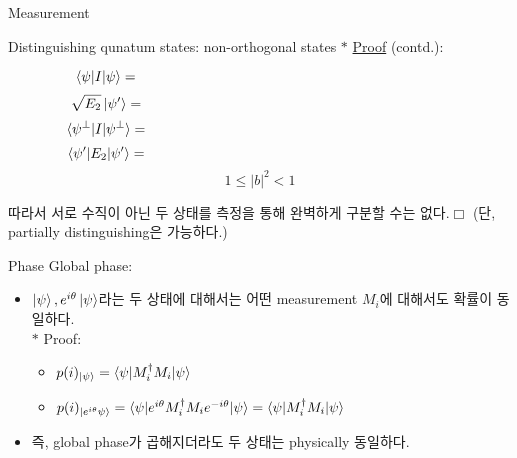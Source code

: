 \documentclass[9pt]{beamer}
\begin{document}
\begin{section}{Measurement}
        \begin{frame}{Distinguishing qunatum states: non-orthogonal states}
            $\ast$ \underline{Proof} (contd.):
            
            $$\braket{\psi|I|\psi} = \qquad \qquad \qquad \qquad \qquad \qquad \qquad \qquad\qquad \qquad \qquad $$
            \vspace{0.5cm}
            $$\sqrt{E_2} \ket{\psi'} = \qquad \qquad \qquad \qquad \qquad \qquad \qquad \qquad\qquad \qquad \qquad $$
            \vspace{0.5cm}
            $$\braket{\psi^\perp|I|\psi^\perp} = \qquad \qquad \qquad \qquad \qquad \qquad \qquad \qquad\qquad \qquad  \qquad $$
            \vspace{0.5cm}
            $$\braket{\psi'|E_2|\psi'} =\qquad \qquad \qquad \qquad \qquad \qquad \qquad \qquad\qquad \qquad \qquad  $$
            \vspace{0.3cm}
            $$1 \le |b|^2 < 1$$
            
            \vspace{0.1cm}

            따라서 서로 수직이 아닌 두 상태를 측정을 통해 완벽하게 구분할 수는 없다.$\Box$ (단, partially distinguishing은 가능하다.)
        \end{frame}

        \begin{frame}{Phase}
            Global phase:
            \begin{itemize}
                \item $\ket{\psi}, e^{i\theta}\ket{\psi}$라는 두 상태에 대해서는 어떤 measurement $M_i$에 대해서도 확률이 동일하다.
                \\ $\ast$ Proof:
                \begin{itemize}
                    \item $p(i)_{\ket{\psi}} = \braket{\psi|M_i^\dagger M_i|\psi}$
                    \item $p(i)_{\ket{e^{i\theta}\psi}} = \braket{\psi|e^{i\theta}M_i^\dagger M_ie^{-i\theta}|\psi} = \braket{\psi|M_i^\dagger M_i|\psi}$
                \end{itemize}
                \item 즉, global phase가 곱해지더라도 두 상태는 physically 동일하다.
            \end{itemize}
            

\end{frame}
\end{section}
\end{document}
